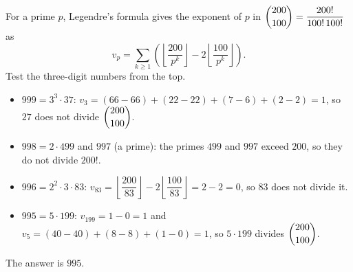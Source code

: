 For a prime $p$, Legendre's formula gives the exponent of $p$ in $\dbinom{200}{100}=\dfrac{200!}{100!\,100!}$ as
\[v_p=\sum_{k\ge1}\left(\left\lfloor\dfrac{200}{p^k}\right\rfloor-2\left\lfloor\dfrac{100}{p^k}\right\rfloor\right).\]
Test the three-digit numbers from the top.
\begin{itemize}
\item $999=3^3\cdot37$: $v_3=(66-66)+(22-22)+(7-6)+(2-2)=1$, so $27$ does not divide $\dbinom{200}{100}$.
\item $998=2\cdot499$ and $997$ (a prime): the primes $499$ and $997$ exceed $200$, so they do not divide $200!$.
\item $996=2^2\cdot3\cdot83$: $v_{83}=\left\lfloor\dfrac{200}{83}\right\rfloor-2\left\lfloor\dfrac{100}{83}\right\rfloor=2-2=0$, so $83$ does not divide it.
\item $995=5\cdot199$: $v_{199}=1-0=1$ and $v_5=(40-40)+(8-8)+(1-0)=1$, so $5\cdot199$ divides $\dbinom{200}{100}$.
\end{itemize}
The answer is $\boxed{995}$.
